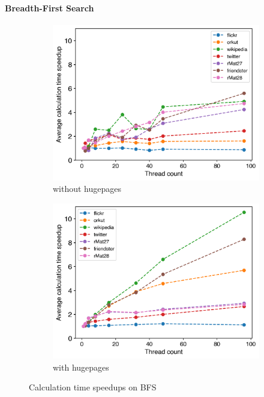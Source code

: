 \paragraph{Breadth-First Search}
\begin{figure}
	\hfil
	\begin{subfigure}{0.4\textwidth}
		\includegraphics[width=\linewidth]{../../plots/singleNodeBFSGaloisThreads.png}
		\caption{without hugepages}
		\label{fig:galoisSpeedupBFS_noHP}
	\end{subfigure}
	\begin{subfigure}{0.4\textwidth}
		\includegraphics[width=\linewidth]{../../plots/singleNodeBFSGaloisHPThreads.png}
		\caption{with hugepages}
		\label{fig:galoisSpeedupBFS_HP}
	\end{subfigure}
	\hfil
	\caption{Calculation time speedups on BFS}
	\label{fig:galoisSpeedupBFS}
\end{figure}

